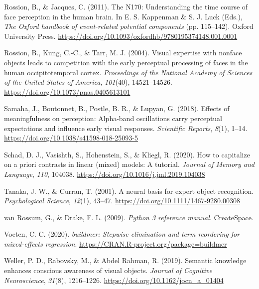 \documentclass[
  english,
  man,11pt,floatsintext]{apa7}
\newlength{\cslhangindent}
\newenvironment{cslreferences}%
  {\setlength{\parindent}{0pt}%
  \everypar{\setlength{\hangindent}{\cslhangindent}}\ignorespaces}%
  {\par}
\begin{document}
\begin{cslreferences}
\leavevmode\hypertarget{ref-rossion2011}{}%
Rossion, B., \& Jacques, C. (2011). The N170: Understanding the time course of face perception in the human brain. In E. S. Kappenman \& S. J. Luck (Eds.), \emph{The Oxford handbook of event-related potential components} (pp. 115--142). Oxford University Press. \url{https://doi.org/10.1093/oxfordhb/9780195374148.001.0001}

\leavevmode\hypertarget{ref-rossion2004}{}%
Rossion, B., Kung, C.-C., \& Tarr, M. J. (2004). Visual expertise with nonface objects leads to competition with the early perceptual processing of faces in the human occipitotemporal cortex. \emph{Proceedings of the National Academy of Sciences of the United States of America}, \emph{101}(40), 14521--14526. \url{https://doi.org/10.1073/pnas.0405613101}

\leavevmode\hypertarget{ref-samaha2018}{}%
Samaha, J., Boutonnet, B., Postle, B. R., \& Lupyan, G. (2018). Effects of meaningfulness on perception: Alpha-band oscillations carry perceptual expectations and influence early visual responses. \emph{Scientific Reports}, \emph{8}(1), 1--14. \url{https://doi.org/10.1038/s41598-018-25093-5}

\leavevmode\hypertarget{ref-schad2020}{}%
Schad, D. J., Vasishth, S., Hohenstein, S., \& Kliegl, R. (2020). How to capitalize on a priori contrasts in linear (mixed) models: A tutorial. \emph{Journal of Memory and Language}, \emph{110}, 104038. \url{https://doi.org/10.1016/j.jml.2019.104038}

\leavevmode\hypertarget{ref-tanaka2001}{}%
Tanaka, J. W., \& Curran, T. (2001). A neural basis for expert object recognition. \emph{Psychological Science}, \emph{12}(1), 43--47. \url{https://doi.org/10.1111/1467-9280.00308}

\leavevmode\hypertarget{ref-vanrossum2009}{}%
van Rossum, G., \& Drake, F. L. (2009). \emph{Python 3 reference manual}. CreateSpace.

\leavevmode\hypertarget{ref-R-buildmer}{}%
Voeten, C. C. (2020). \emph{buildmer: Stepwise elimination and term reordering for mixed-effects regression}. \url{https://CRAN.R-project.org/package=buildmer}

\leavevmode\hypertarget{ref-weller2019}{}%
Weller, P. D., Rabovsky, M., \& Abdel Rahman, R. (2019). Semantic knowledge enhances conscious awareness of visual objects. \emph{Journal of Cognitive Neuroscience}, \emph{31}(8), 1216--1226. \url{https://doi.org/10.1162/jocn_a_01404}
\end{cslreferences}
\end{document}
